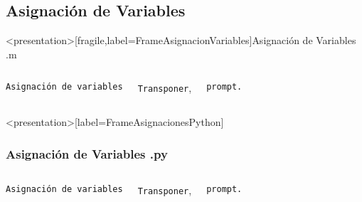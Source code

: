 
\subsection{Asignación de Variables}

\mode*
\begin{frame}<presentation>[fragile,label=FrameAsignacionVariables]{Asignación de Variables .m}

\begin{columns}[T]

 \vspace{0.5cm}

\hfill \texttt{Asignación de variables}

\vspace{1cm}

\hfill \texttt{Transponer},

\vspace{1cm}

\hfill \texttt{prompt.}

\begin{codeblock}
  
\end{codeblock}

\end{columns}
\end{frame}

\begin{frame}<presentation>[label=FrameAsignacionesPython]
  \frametitle{Asignación de Variables .py}
\begin{columns}[T]

 \vspace{0.5cm}

\flushright \texttt{Asignación de variables}

\vspace{1cm}

\hfill \texttt{Transponer},

\vspace{1cm}

\hfill \texttt{prompt.}

\begin{codeblock}
  
\end{codeblock}

\end{columns}

\end{frame}

